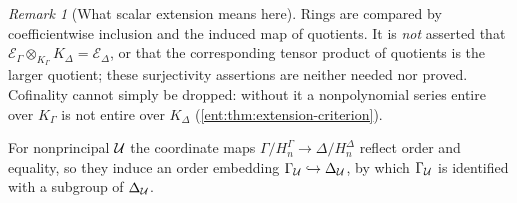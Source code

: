 \documentclass[11pt]{article}
\theoremstyle{plain}
\theoremstyle{plain}
\theoremstyle{plain}
\theoremstyle{definition}
\theoremstyle{definition}
\theoremstyle{definition}
\theoremstyle{definition}
\theoremstyle{remark}
\newtheorem{remark}[remark]{Remark}
\begin{document}
\begin{remark}[What scalar extension means here]
Rings are compared by coefficientwise inclusion and the induced map of
quotients. It is \emph{not} asserted that
$\mathcal E_\Gamma\otimes_{K_\Gamma}K_\Delta=\mathcal E_\Delta$, or that the
corresponding tensor product of quotients is the larger quotient; these
surjectivity assertions are neither needed nor proved. Cofinality cannot
simply be dropped: without it a nonpolynomial series entire over $K_\Gamma$
is not entire over $K_\Delta$ (\cref{ent:thm:extension-criterion}).
\end{remark}

For nonprincipal $\mathcal U$ the coordinate maps
$\Gamma/H_n^\Gamma\to\Delta/H_n^\Delta$ reflect order and equality, so they
induce an order embedding $\Gamma_\mathcal U\hookrightarrow\Delta_\mathcal U$,
by which $\Gamma_\mathcal U$ is identified with a subgroup of $\Delta_\mathcal U$.
\end{document}
